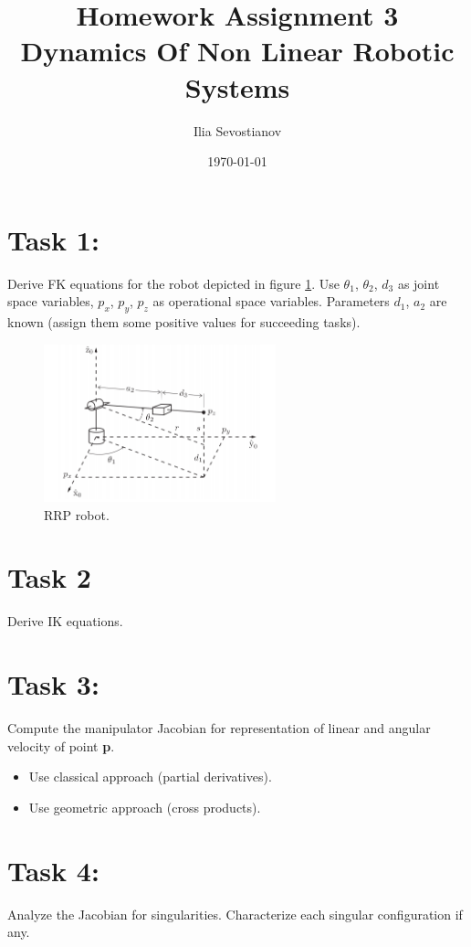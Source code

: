 \documentclass[12pt, a4paper]{report}
\title{%
Homework Assignment 3 
   \\
  \large  Dynamics Of Non Linear Robotic Systems}
\author{Ilia Sevostianov %
    }
\date{\today}
\begin{document}
	\maketitle


\section*{Task 1:}
Derive FK equations for the robot depicted in figure \ref{fig:mesh1}. Use $\theta_1$, $\theta_2$, $d_3$ as
joint space variables, $p_x$, $p_y$, $p_z$ as operational space variables. Parameters
$d_1$, $a_2$ are known (assign them some positive values for succeeding tasks).

\begin{figure}[H]
	\centering
		\includegraphics[width=0.6\textwidth]{Image1} %
	\caption{RRP robot.} %
	\label{fig:mesh1}
\end{figure}

\section*{Task 2} \label{sec:Task 2}
 Derive IK equations.


\section*{Task 3:}
Compute the manipulator Jacobian for representation of linear and angular velocity of point \textbf{p}.
\begin{itemize}
	\item Use classical approach (partial derivatives).
\item Use geometric approach (cross products).
\end{itemize}


\section*{Task 4:}
Analyze the Jacobian for singularities. Characterize each singular configuration if any.
\end{document}

